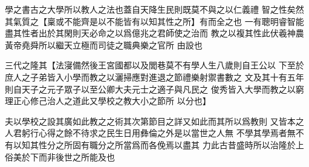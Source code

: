 \documentclass[oneside]{book}
\begin{document}
\fontsize{20pt}{30pt}\selectfont

學之書古之大學所以教人之法也蓋自天降生民則既莫不與之以仁義禮
智之性矣然其氣質之【稟或不能齊是以不能皆有以知其性之所】有而全之也
一有聰明睿智能盡其性者出於其閑則天必命之以爲億兆之君師使之治而
教之以複其性此伏羲神農黃帝堯舜所以繼天立極而司徒之職典樂之官所
由設也

三代之隆其【法寖備然後王宮國都以及閭巷莫不有學人生八歲則自王公以
下至於庶人之子弟皆入小學而教之以灑掃應對進退之節禮樂射禦書數之
文及其十有五年則自天子之元子眾子以至公卿大夫元士之適子與凡民之
俊秀皆入大學而教之以窮理正心修己治人之道此又學校之教大小之節所
以分也】

夫以學校之設其廣如此教之之術其次第節目之詳又如此而其所以爲教則
又皆本之人君躬行心得之餘不待求之民生日用彝倫之外是以當世之人無
不學其學焉者無不有以知其性分之所固有職分之所當爲而各俛焉以盡其
力此古昔盛時所以治隆於上俗美於下而非後世之所能及也
\end{document}
